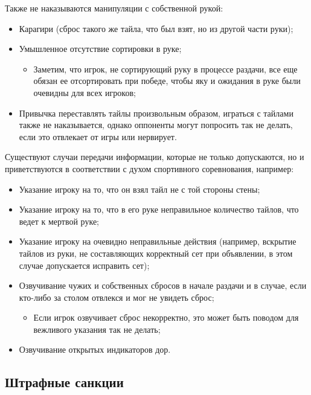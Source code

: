 Также не наказываются манипуляции с собственной рукой:
\begin{itemize}
	\item Карагири (сброс такого же тайла, что был взят, но из другой части руки);
	\item Умышленное отсутствие сортировки в руке;
	\begin{itemize}
		\item Заметим, что игрок, не сортирующий руку в процессе раздачи, все еще обязан ее отсортировать при победе, чтобы яку и ожидания в руке были очевидны для всех игроков;
	\end{itemize}
	\item Привычка переставлять тайлы произвольным образом, играться с тайлами также не наказывается, однако оппоненты могут попросить так не делать, если это отвлекает от игры или нервирует.
\end{itemize}

Существуют случаи передачи информации, которые не только допускаются, но и приветствуются в соответствии с духом спортивного соревнования, например:
\begin{itemize}
	\item Указание игроку на то, что он взял тайл не с той стороны стены;
	\item Указание игроку на то, что в его руке неправильное количество тайлов, что ведет к мертвой руке;
	\item Указание игроку на очевидно неправильные действия (например, вскрытие тайлов из руки, не составляющих корректный сет при объявлении, в этом случае допускается исправить сет);
	\item Озвучивание чужих и собственных сбросов в начале раздачи и в случае, если кто-либо за столом отвлекся и мог не увидеть сброс;
	\begin{itemize}
		\item Если игрок озвучивает сброс некорректно, это может быть поводом для вежливого указания так не делать;
	\end{itemize}
	\item Озвучивание открытых индикаторов дор.
\end{itemize}

\subsection{Штрафные санкции}

